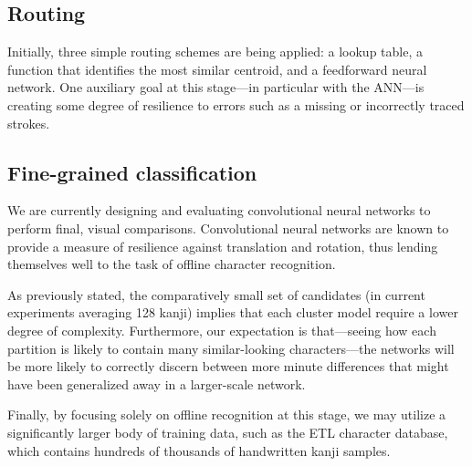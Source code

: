 \documentclass[10pt,conference,a4paper]{IEEEtran}
\begin{document}


	\subsection{Routing}

	Initially, three simple routing schemes are being applied: a lookup table, a function that
	identifies the most similar centroid, and a feedforward neural network. One auxiliary goal
	at this stage---in particular with the ANN---is creating some degree of resilience to errors
	such as a missing or incorrectly traced strokes.


	\subsection{Fine-grained classification}

	We are currently designing and evaluating convolutional neural networks to perform final, visual comparisons.
	Convolutional neural networks are known to provide a measure of resilience against translation and rotation,
	thus lending themselves well to the task of offline character recognition.
	
	As previously stated, the comparatively small set of candidates (in current experiments averaging 128 kanji)
	implies that each cluster model require a lower degree of complexity. Furthermore, our expectation is that---seeing
	how each partition is likely to contain many similar-looking characters---the networks will be more likely
	to correctly discern between more minute differences that might have been generalized away in a larger-scale network.

	Finally, by focusing solely on offline recognition at this stage, we may utilize a significantly larger body of 
	training data, such as the ETL character database, which contains hundreds of thousands of handwritten kanji samples. \cite{yamamoto1986recognition} 
\end{document}
